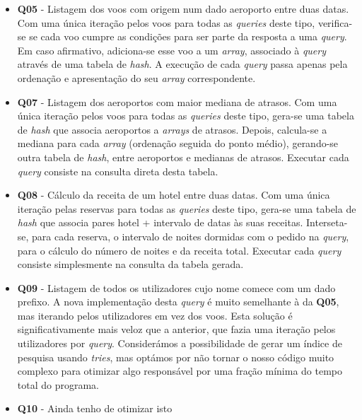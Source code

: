 \documentclass[11pt, a4paper]{article}
\begin{document}
\begin{itemize}
    \item \textbf{Q05} - Listagem dos voos com origem num dado aeroporto entre duas datas. Com uma
                         única iteração pelos voos para todas as \emph{queries} deste tipo,
                         verifica-se se cada voo cumpre as condições para ser parte da resposta
                         a uma \emph{query}. Em caso afirmativo, adiciona-se esse voo a um
                         \emph{array}, associado à \emph{query} através de uma tabela de
                         \emph{hash}. A execução de cada \emph{query} passa apenas pela ordenação e
                         apresentação do seu \emph{array} correspondente.

    \item \textbf{Q07} - Listagem dos aeroportos com maior mediana de atrasos. Com uma única
                         iteração pelos voos para todas as \emph{queries} deste tipo, gera-se uma
                         tabela de \emph{hash} que associa aeroportos a \emph{arrays} de atrasos.
                         Depois, calcula-se a mediana para cada \emph{array} (ordenação seguida do
                         ponto médio), gerando-se outra tabela de \emph{hash}, entre aeroportos e
                         medianas de atrasos. Executar cada \emph{query} consiste na consulta direta
                         desta tabela.

    \item \textbf{Q08} - Cálculo da receita de um hotel entre duas datas. Com uma única iteração
                         pelas reservas para todas as \emph{queries} deste tipo, gera-se uma tabela
                         de \emph{hash} que associa pares hotel + intervalo de datas às suas
                         receitas. Interseta-se, para cada reserva, o intervalo de noites dormidas
                         com o pedido na \emph{query}, para o cálculo do número de noites e da
                         receita total. Executar cada \emph{query} consiste simplesmente na consulta
                         da tabela gerada.

    \item \textbf{Q09} - Listagem de todos os utilizadores cujo nome comece com um dado prefixo. A
                         nova implementação desta \emph{query} é muito semelhante à da \textbf{Q05},
                         mas iterando pelos utilizadores em vez dos voos. Esta solução é
                         significativamente mais veloz que a anterior, que fazia uma iteração pelos
                         utilizadores por \emph{query}. Considerámos a possibilidade
                         de gerar um índice de pesquisa usando \emph{tries}, mas optámos por não
                         tornar o nosso código muito complexo para otimizar algo responsável por uma
                         fração mínima do tempo total do programa.

    \item \textbf{Q10} - {\color{red}Ainda tenho de otimizar isto}
\end{itemize}
\end{document}
